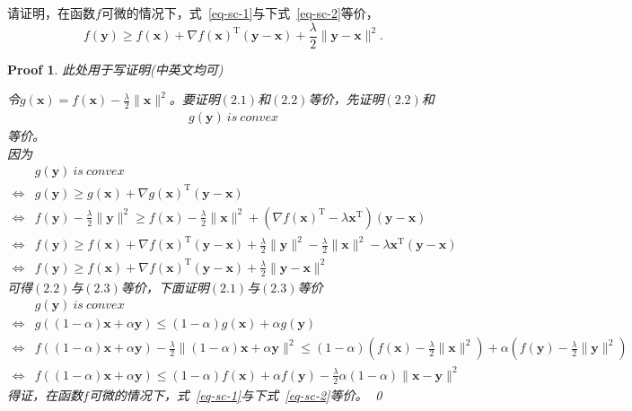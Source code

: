 \documentclass[a4paper,UTF8]{article}
\numberwithin{equation}{section}
\newtheorem*{myProof}{Proof}
\begin{document}
请证明，在函数$f$可微的情况下，式~\eqref{eq-sc-1}与下式~\eqref{eq-sc-2}等价，
\begin{equation}
  \label{eq-sc-2}
  f(\mathbf{y}) \geq f(\mathbf{x}) + \nabla f(\mathbf{x})^\mathrm{T}(\mathbf{y}-\mathbf{x}) + \frac{\lambda}{2}\lVert \mathbf{y} - \mathbf{x}\rVert^2.
\end{equation}
\begin{myProof}
此处用于写证明(中英文均可)

令$g(\mathbf{x}) = f(\mathbf{x}) - \frac{\lambda}{2}\lVert \mathbf{x}\rVert^2$。要证明$(2.1)$和$(2.2)$等价，先证明$(2.2)$和
\begin{equation}
\begin{aligned}
g(\mathbf{y})\ is\ convex
\end{aligned}
\end{equation}
等价。\\
因为
\begin{equation}
\begin{aligned}
&g(\mathbf{y})\ is\ convex \\
\Leftrightarrow &g(\mathbf{y}) \geq g(\mathbf{x}) + \nabla g(\mathbf{x})^\mathrm{T}(\mathbf{y}-\mathbf{x})\\
\Leftrightarrow &f(\mathbf{y}) - \frac{\lambda}{2}\lVert \mathbf{y}\rVert^2 \geq f(\mathbf{x}) - \frac{\lambda}{2}\lVert \mathbf{x}\rVert^2 + (\nabla f(\mathbf{x})^\mathrm{T} - \lambda\mathbf{x}^\mathrm{T})(\mathbf{y} - \mathbf{x})\\
\Leftrightarrow &f(\mathbf{y}) \geq f(\mathbf{x}) + \nabla f(\mathbf{x})^\mathrm{T}(\mathbf{y} - \mathbf{x}) + \frac{\lambda}{2}\lVert \mathbf{y} \rVert^2 - \frac{\lambda}{2}\lVert \mathbf{x} \rVert^2 - \lambda \mathbf{x}^\mathrm{T}(\mathbf{y}-\mathbf{x})\\
\Leftrightarrow & f(\mathbf{y}) \geq f(\mathbf{x}) + \nabla f(\mathbf{x})^\mathrm{T}(\mathbf{y} - \mathbf{x}) + \frac{\lambda}{2}\lVert \mathbf{y}-\mathbf{x} \rVert^2
\end{aligned}
\end{equation}
可得$(2.2)$与$(2.3)$等价，下面证明$(2.1)$与$(2.3)$等价
\begin{equation}
\begin{aligned}
&g(\mathbf{y})\ is\ convex \\
\Leftrightarrow & g((1-\alpha)\mathbf{x} + \alpha\mathbf{y}) \leq (1-\alpha)g(\mathbf{x}) + \alpha g(\mathbf{y})\\
\Leftrightarrow & f((1-\alpha)\mathbf{x} + \alpha\mathbf{y}) - \frac{\lambda}{2}\lVert (1-\alpha)\mathbf{x} + \alpha\mathbf{y} \rVert^2 \leq (1-\alpha)(f(\mathbf{x})-\frac{\lambda}{2}\lVert \mathbf{x} \rVert^2) + \alpha(f(\mathbf{y}) - \frac{\lambda}{2}\lVert \mathbf{y} \rVert^2)\\
\Leftrightarrow & f((1-\alpha)\mathbf{x} + \alpha\mathbf{y})\leq (1-\alpha)f(\mathbf{x}) + \alpha f(\mathbf{y}) - \frac{\lambda}{2}\alpha(1-\alpha)\lVert \mathbf{x} - \mathbf{y}\rVert^2
\end{aligned}
\end{equation}
得证，在函数$f$可微的情况下，式~\eqref{eq-sc-1}与下式~\eqref{eq-sc-2}等价。
\qed
\end{myProof}
\end{document}
